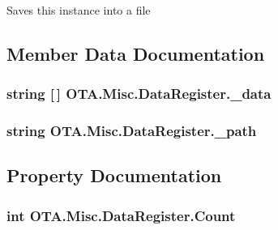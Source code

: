 Saves this instance into a file 



\subsection{Member Data Documentation}
\hypertarget{class_o_t_a_1_1_misc_1_1_data_register_abb719d38497dfeba3ac96050b88f5bdb}{}
\subsubsection[{\+\_\+data}]{\setlength{\rightskip}{0pt plus 5cm}string \mbox{[}$\,$\mbox{]} O\+T\+A.\+Misc.\+Data\+Register.\+\_\+data\hspace{0.3cm}{\ttfamily [protected]}}\label{class_o_t_a_1_1_misc_1_1_data_register_abb719d38497dfeba3ac96050b88f5bdb}
\hypertarget{class_o_t_a_1_1_misc_1_1_data_register_a8dc234d6ed4b1d3372c9447a5918d524}{}
\subsubsection[{\+\_\+path}]{\setlength{\rightskip}{0pt plus 5cm}string O\+T\+A.\+Misc.\+Data\+Register.\+\_\+path\hspace{0.3cm}{\ttfamily [protected]}}\label{class_o_t_a_1_1_misc_1_1_data_register_a8dc234d6ed4b1d3372c9447a5918d524}


\subsection{Property Documentation}
\hypertarget{class_o_t_a_1_1_misc_1_1_data_register_a8ff81a20959ff6ad645a2660b6345edf}{}
\subsubsection[{Count}]{\setlength{\rightskip}{0pt plus 5cm}int O\+T\+A.\+Misc.\+Data\+Register.\+Count\hspace{0.3cm}{\ttfamily [get]}}\label{class_o_t_a_1_1_misc_1_1_data_register_a8ff81a20959ff6ad645a2660b6345edf}


